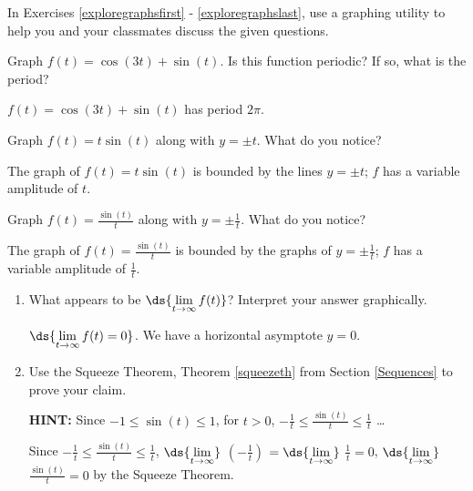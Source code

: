\documentclass{ximera}
\begin{document}
\begin{question}
In Exercises \ref{exploregraphsfirst} - \ref{exploregraphslast}, use a graphing utility to help you and your classmates discuss the given questions.


\begin{problem} \label{exploregraphsfirst}
Graph $f(t) = \cos(3t) + \sin(t)$.  Is this function periodic?  If so, what is the period? 

\begin{solution}
    $f(t) = \cos(3t) + \sin(t)$ has period $2\pi$.
\end{solution}
\end{problem}

\begin{problem} 
Graph $f(t) = t \sin(t)$ along with  $y = \pm t$. What do you notice? 

\begin{solution}
     The graph of  $f(t) = t \sin(t)$ is bounded by the lines  $y = \pm t$;   $f$ has a variable amplitude of $t$.
\end{solution}
\end{problem}

\begin{problem}
Graph $f(t) = \frac{\sin(t)}{t}$ along with  $y = \pm \frac{1}{t}$.   What do you notice?

\begin{solution}
     The graph of $f(t) = \frac{\sin(t)}{t}$ is  bounded by the graphs of  $y = \pm \frac{1}{t}$; $f$ has a variable amplitude of $\frac{1}{t}$.
\end{solution}

\begin{enumerate}

\item What appears to be $\ds{\lim_{t \rightarrow \infty} f(t)}$?    Interpret your answer graphically.

\begin{solution}
    $\ds{\lim_{t \rightarrow \infty} f(t) = 0}$.    We have a horizontal asymptote $y = 0$.
\end{solution}

\item  Use the Squeeze Theorem, Theorem \ref{squeezeth} from Section \ref{Sequences} to prove your claim.  

\textbf{HINT:}  Since $-1 \leq \sin(t) \leq 1$, for $t>0$, $-\frac{1}{t} \leq \frac{\sin(t)}{t} \leq \frac{1}{t}$ \ldots


\begin{solution}
     Since   $-\frac{1}{t} \leq \frac{\sin(t)}{t} \leq \frac{1}{t}$,  $\ds{\lim_{t \rightarrow \infty}}$  $\left(- \frac{1}{t}\right)$ $=\ds{\lim_{t \rightarrow \infty}}$ $\frac{1}{t} = 0$,    $\ds{\lim_{t \rightarrow \infty}}$ $\frac{\sin(t)}{t} = 0$ by the Squeeze Theorem.
\end{solution}


\end{enumerate}
\end{problem}
\end{question}
\end{document}
